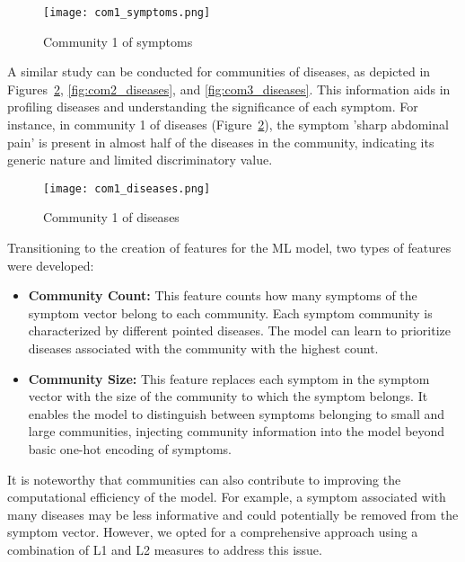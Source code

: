 \begin{figure}[H]
    \centering
    \texttt{[image: com1\_symptoms.png]}
    \caption{Community 1 of symptoms}
    \label{fig:com1_symptoms}
\end{figure}

A similar study can be conducted for communities of diseases, as depicted in Figures~\ref{fig:com1_diseases}, 
\ref{fig:com2_diseases}, and \ref{fig:com3_diseases}. This information aids in profiling diseases and understanding 
the significance of each symptom. For instance, in community 1 of diseases (Figure~\ref{fig:com1_diseases}), 
the symptom 'sharp abdominal pain' is present in almost half of the diseases in the community, indicating its 
generic nature and limited discriminatory value.

\begin{figure}[H]
    \centering
    \texttt{[image: com1\_diseases.png]}
    \caption{Community 1 of diseases}
    \label{fig:com1_diseases}
\end{figure}

Transitioning to the creation of features for the ML model, two types of features were developed:\\

\begin{itemize}
    \setlength\itemsep{1em} %

    \item \textbf{Community Count:} This feature counts how many symptoms of the symptom vector belong to each community. 
    Each symptom community is characterized by different pointed diseases. The model can learn to prioritize 
    diseases associated with the community with the highest count.
    
    \item \textbf{Community Size:} This feature replaces each symptom in the symptom vector with the size of the 
    community to which the symptom belongs. It enables the model to distinguish between symptoms belonging to small and 
    large communities, injecting community information into the model beyond basic one-hot encoding of symptoms.
\end{itemize}

\vspace{0.4cm}
It is noteworthy that communities can also contribute to improving the computational efficiency of the model. 
For example, a symptom associated with many diseases may be less informative and could potentially be removed from the 
symptom vector. However, we opted for a comprehensive approach using a combination of L1 and L2 measures to address this issue.

